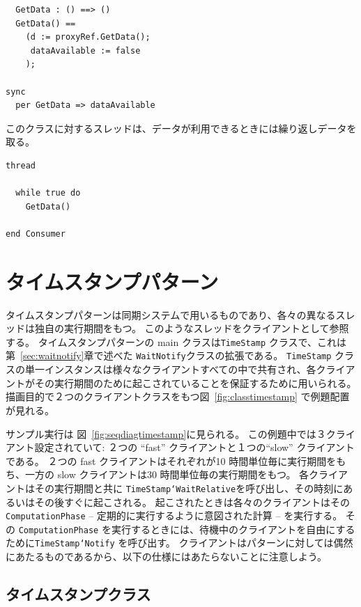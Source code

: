 \documentclass[\pformat,12pt]{jreport}
\begin{document}
\begin{lstlisting}
  GetData : () ==> ()
  GetData() ==
    (d := proxyRef.GetData();
     dataAvailable := false
    );

sync
  per GetData => dataAvailable
\end{lstlisting}

このクラスに対するスレッドは、データが利用できるときには繰り返しデータを取る。

\begin{lstlisting}
thread

  while true do
    GetData()

end Consumer
\end{lstlisting}

\section{タイムスタンプパターン}\label{sec:TimeStamp}

タイムスタンプパターンは同期システムで用いるものであり、各々の異なるスレッドは独自の実行期間をもつ。
このようなスレッドをクライアントとして参照する。
タイムスタンプパターンの main クラスは\texttt{TimeStamp} クラスで、これは 第~\ref{sec:waitnotify}章で述べた \texttt{WaitNotify}クラスの拡張である。
\texttt{TimeStamp} クラスの単一インスタンスは様々なクライアントすべての中で共有され、各クライアントがその実行期間のために起こされていることを保証するために用いられる。
描画目的で２つのクライアントクラスをもつ図~\ref{fig:classtimestamp} で例題配置が見れる。

サンプル実行は 図~\ref{fig:seqdiagtimestamp}に見られる。 
この例題中では３クライアント設定されていて: ２つの ``fast'' クライアントと１つの``slow'' クライアントである。
２つの fast クライアントはそれぞれが10 時間単位毎に実行期間をもち、一方の slow クライアントは30 時間単位毎の実行期間をもつ。
各クライアントはその実行期間と共に \texttt{TimeStamp`WaitRelative}を呼び出し、その時刻にあるいはその後すぐに起こされる。
起こされたときは各々のクライアントはその\texttt{ComputationPhase} -- 定期的に実行するように意図された計算 -- を実行する。
その \texttt{ComputationPhase} を実行するときには、待機中のクライアントを自由にするために\texttt{TimeStamp`Notify} を呼び出す。
クライアントはパターンに対しては偶然にあたるものであるから、以下の仕様にはあたらないことに注意しよう。

\subsection{タイムスタンプクラス}
\end{document}
